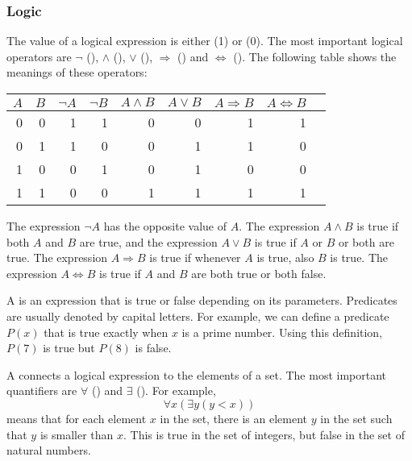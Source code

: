 \subsubsection{Logic}


The value of a logical expression is either
 (1) or  (0).
The most important logical operators are
$\lnot$ (),
$\land$ (),
$\lor$ (),
$\Rightarrow$ () and
$\Leftrightarrow$ ().
The following table shows the meanings of these operators:

\begin{center}
\begin{tabular}{rr|rrrrrrr}
$A$ & $B$ & $\lnot A$ & $\lnot B$ & $A \land B$ & $A \lor B$ & $A \Rightarrow B$ & $A \Leftrightarrow B$ \\
\hline
0 & 0 & 1 & 1 & 0 & 0 & 1 & 1 \\
0 & 1 & 1 & 0 & 0 & 1 & 1 & 0 \\
1 & 0 & 0 & 1 & 0 & 1 & 0 & 0 \\
1 & 1 & 0 & 0 & 1 & 1 & 1 & 1 \\
\end{tabular}
\end{center}

The expression $\lnot A$ has the opposite value of $A$.
The expression $A \land B$ is true if both $A$ and $B$
are true,
and the expression $A \lor B$ is true if $A$ or $B$ or both
are true.
The expression $A \Rightarrow B$ is true
if whenever $A$ is true, also $B$ is true.
The expression $A \Leftrightarrow B$ is true
if $A$ and $B$ are both true or both false.


A  is an expression that is true or false
depending on its parameters.
Predicates are usually denoted by capital letters.
For example, we can define a predicate $P(x)$
that is true exactly when $x$ is a prime number.
Using this definition, $P(7)$ is true but $P(8)$ is false.


A  connects a logical expression
to the elements of a set.
The most important quantifiers are
$\forall$ () and $\exists$ ().
For example,
\[\forall x (\exists y (y < x))\]
means that for each element $x$ in the set,
there is an element $y$ in the set
such that $y$ is smaller than $x$.
This is true in the set of integers,
but false in the set of natural numbers.

